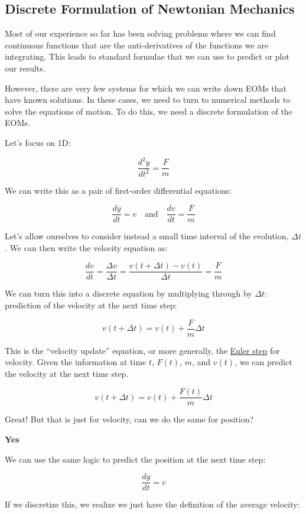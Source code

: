 \documentclass[11pt]{article}
\begin{document}
    \subsection{Discrete Formulation of Newtonian
Mechanics}\label{discrete-formulation-of-newtonian-mechanics}

Most of our experience so far has been solving problems where we can
find continuous functions that are the anti-derivatives of the functions
we are integrating. This leads to standard formulae that we can use to
predict or plot our results.

However, there are very few systems for which we can write down EOMs
that have known solutions. In these cases, we need to turn to numerical
methods to solve the equations of motion. To do this, we need a discrete
formulation of the EOMs.

Let's focus on 1D:

\[\dfrac{d^2y}{dt^2} = \dfrac{F}{m}\]

We can write this as a pair of first-order differential equations:

\[\dfrac{dy}{dt} = v \quad \textrm{and} \quad \dfrac{dv}{dt} = \dfrac{F}{m}\]

Let's allow ourselves to consider instead a small time interval of the
evolution, \(\Delta t\). We can then write the velocity equation as:

\[\dfrac{dv}{dt} = \dfrac{\Delta v}{\Delta t}= \dfrac{v(t+\Delta t) - v(t)}{\Delta t} = \dfrac{F}{m}\]

We can turn this into a discrete equation by multiplying through by
\(\Delta t\): prediction of the velocity at the next time step:

\[v(t+\Delta t) = v(t) + \dfrac{F}{m} \Delta t\]

This is the ``velocity update'' equation, or more generally, the
\href{https://en.wikipedia.org/wiki/Euler_method}{Euler step} for
velocity. Given the information at time \(t\), \(F(t)\), \(m\), and
\(v(t)\), we can predict the velocity at the next time step.

\[v(t+\Delta t) = v(t) + \dfrac{F(t)}{m} \Delta t\]

Great! But that is just for velocity, can we do the same for position?

\textbf{Yes}

We can use the same logic to predict the position at the next time step:

\[\dfrac{dy}{dt} = v\]

If we discretize this, we realize we just have the definition of the
average velocity:
\end{document}
